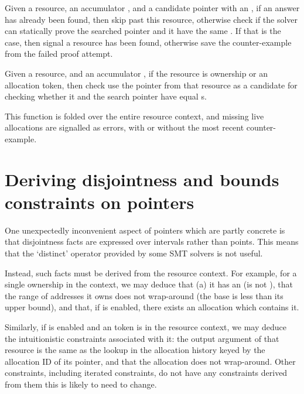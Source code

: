 
Given a resource, an accumulator , and a candidate pointer
with an  , if an answer has already been
found, then skip past this resource, otherwise check if the solver can
statically prove the searched pointer  and it have the same
\@. If that is the case, then signal a resource has been found,
otherwise save the counter-example from the failed proof attempt.


Given a resource, and an accumulator , if the resource is
ownership or an allocation token, then check use the pointer from that resource
as a candidate for checking whether it and the search pointer have equal
s.


This function is folded over the entire resource context, and missing live
allocations are signalled as errors, with or without the most recent
counter-example.


\section{Deriving disjointness and bounds constraints on pointers}

One unexpectedly inconvenient aspect of pointers which are partly concrete is
that disjointness facts are expressed over intervals rather than points. This
means that the `distinct' operator provided by some SMT solvers is not
useful.

Instead, such facts must be derived from the resource context. For
example, for a single ownership in the context, we may deduce that (a) it has
an  (is not ), that the range of addresses it
owns does not wrap-around (the base is less than its upper bound), and that, if
 is enabled, there exists an allocation which contains it.


Similarly, if  is enabled and an  token is in the
resource context, we may deduce the intuitionistic constraints associated with
it: the output argument of that resource is the same as the lookup in the
 allocation history keyed by the allocation ID of its pointer,
and that the allocation does not wrap-around. Other constraints, including iterated
constraints, do not have any constraints derived from them \textemdash{} this is
likely to need to
change.

